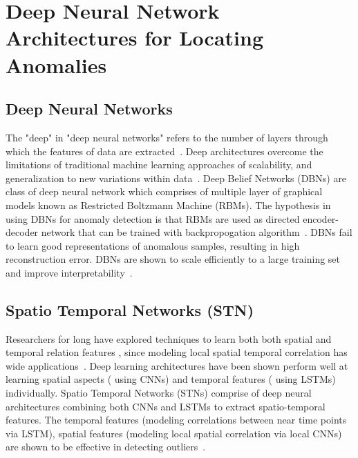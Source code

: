 \section{Deep Neural Network Architectures for Locating Anomalies}
\label{sec:locatingAnomalieswithNNArchitecture}


\subsection{Deep Neural Networks}
\label{sec:dnn}
The "deep" in "deep neural networks" refers to the number of layers through which the features of data are extracted~\cite{schmidhuber2015deep,bengio2009learning}. Deep architectures overcome the limitations of traditional machine learning approaches of scalability, and generalization to new variations within data~\cite{lecun2015deep}. Deep Belief Networks (DBNs) are class of deep neural network which comprises of multiple layer of graphical models known as Restricted Boltzmann Machine (RBMs).
The hypothesis in using DBNs for anomaly detection is that RBMs are used as  directed encoder-decoder network that can be trained with backpropogation algorithm~\cite{werbos1990backpropagation}. DBNs fail to learn good representations of anomalous samples, resulting in high reconstruction error. DBNs  are shown to scale efficiently to a large training set and improve interpretability~\cite{wulsin2010semi}.


\subsection{Spatio Temporal Networks (STN)}
\label{sec:stn}
Researchers for long have explored  techniques to learn both both spatial and temporal relation features , since modeling local spatial temporal correlation has wide applications~\cite{zhang2018detecting}. Deep learning architectures have been shown perform well at learning spatial aspects ( using CNNs) and temporal features ( using LSTMs) individually. Spatio Temporal Networks (STNs) comprise of deep neural architectures combining both CNNs and LSTMs to extract spatio-temporal features. The temporal
features (modeling correlations between near time points via LSTM), spatial features (modeling
local spatial correlation via local CNNs) are shown to be effective in detecting outliers~\cite{lee2018stan,szeker2014spatio,nie2018spatio,dereszynski2011spatiotemporal}.

